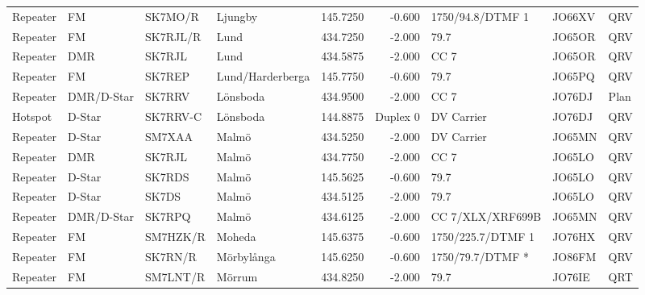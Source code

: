 {\begin{landscape}
\begin{longtable}{llllrrlll}
	Repeater          & FM              & SK7MO/R  & Ljungby              &     145.7250 &     -0.600 & 1750/94.8/DTMF 1  & JO66XV      & QRV      \\
	Repeater          & FM              & SK7RJL/R & Lund                 &     434.7250 &     -2.000 & 79.7              & JO65OR      & QRV      \\
	Repeater          & DMR             & SK7RJL   & Lund                 &     434.5875 &     -2.000 & CC 7              & JO65OR      & QRV      \\
	Repeater          & FM              & SK7REP   & Lund/Harderberga     &     145.7750 &     -0.600 & 79.7              & JO65PQ      & QRV      \\
	Repeater          & DMR/D-Star      & SK7RRV   & Lönsboda             &     434.9500 &     -2.000 & CC 7              & JO76DJ      & Plan     \\
	Hotspot           & D-Star          & SK7RRV-C & Lönsboda             &     144.8875 &   Duplex 0 & DV Carrier        & JO76DJ      & QRV      \\
	Repeater          & D-Star          & SM7XAA   & Malmö                &     434.5250 &     -2.000 & DV Carrier        & JO65MN      & QRV      \\
	Repeater          & DMR             & SK7RJL   & Malmö                &     434.7750 &     -2.000 & CC 7              & JO65LO      & QRV      \\
	Repeater          & D-Star          & SK7RDS   & Malmö                &     145.5625 &     -0.600 & 79.7              & JO65LO      & QRV      \\
	Repeater          & D-Star          & SK7DS    & Malmö                &     434.5125 &     -2.000 & 79.7              & JO65LO      & QRV      \\
	Repeater          & DMR/D-Star      & SK7RPQ   & Malmö                &     434.6125 &     -2.000 & CC 7/XLX/XRF699B  & JO65MN      & QRV      \\
	Repeater          & FM              & SM7HZK/R & Moheda               &     145.6375 &     -0.600 & 1750/225.7/DTMF 1 & JO76HX      & QRV      \\
	Repeater          & FM              & SK7RN/R  & Mörbylånga           &     145.6250 &     -0.600 & 1750/79.7/DTMF *  & JO86FM      & QRV      \\
	Repeater          & FM              & SM7LNT/R & Mörrum               &     434.8250 &     -2.000 & 79.7              & JO76IE      & QRT      \\

\end{longtable}
\end{landscape}}
